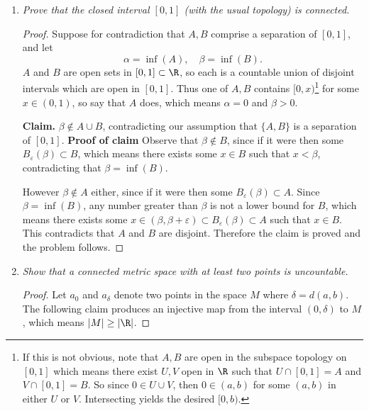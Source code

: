 \documentclass[12pt,letterpaper]{article}
\begin{document}
\begin{enumerate}
	\begin{enumerate}
	\item \textit{Prove that the closed interval $[0,1]$ (with the usual topology) is connected. }
		\begin{proof}
		Suppose for contradiction that $A,B$ comprise a separation of $[0,1]$, and let 
		$$\alpha=\inf(A), \quad \beta=\inf(B).$$ 
		$A$ and $B$ are open sets in $[0,1]\subset \R$, so each is a countable union of disjoint intervals which are open in $[0,1]$. Thus one of $A,B$ contains $[0,x)$\footnote{If this is not obvious, note that $A,B$ are open in the subspace topology on $[0,1]$ which means there exist $U,V$ open in $\R$ such that $U\cap[0,1]=A$ and $V\cap[0,1]=B.$ So since $0\in U\cup V$, then $0\in(a,b)$ for some $(a,b)$ in either $U$ or $V$. Intersecting yields the desired $[0,b)$.} 
		for some $x\in(0,1)$, so \Wlog{} say that $A$ does, which means $\alpha=0$ and $\beta>0$. 
		
		\textbf{Claim. } $\beta\not\in A\cup B$, contradicting our assumption that $\{A,B\}$ is a separation of $[0,1]$. 
		\textbf{Proof of claim}
		Observe that $\beta\not\in B$, since if it were then some $B_\varepsilon(\beta)\subset B$, which means there exists some $x\in B$ such that $x<\beta$, contradicting that $\beta=\inf(B).$ 
		
		However $\beta\not\in A$ either, since if it were then some $B_\varepsilon(\beta)\subset A$. Since $\beta=\inf(B)$, any number greater than $\beta$ is not a lower bound for $B$, which means there exists some $x\in (\beta,\beta+\varepsilon)\subset B_\varepsilon(\beta)\subset A$ such that $x\in B$. This contradicts that $A$ and $B$ are disjoint. Therefore the claim is proved and the problem follows. 		
		\end{proof}
	\item \textit{Show that a connected metric space with at least two points is uncountable. }
	\begin{proof}
	Let $a_0$ and $a_\delta$ denote two points in the space $M$ where $\delta=d(a,b)$. The following claim produces an injective map from the interval $(0,\delta)$ to $M$, which means $|M|\geq |\R|$. 
	

\end{proof}
\end{enumerate}
\end{enumerate}
\end{document}
